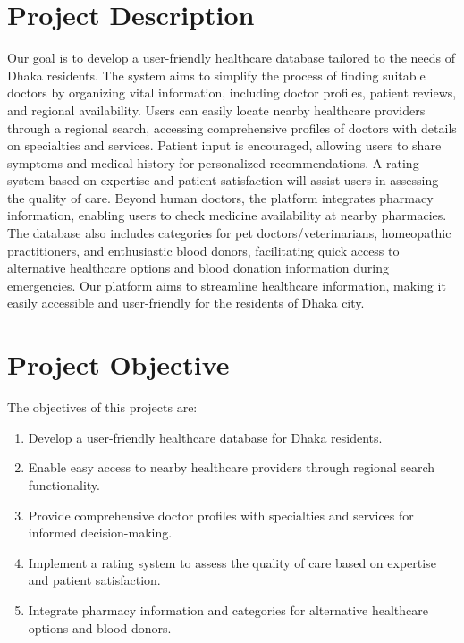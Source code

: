 \documentclass[11pt]{article}
\begin{document}
\section{Project Description}
Our goal is to develop a user-friendly healthcare database tailored to the needs of Dhaka residents. The system aims to simplify the process of finding suitable doctors by organizing vital information, including doctor profiles, patient reviews, and regional availability. Users can easily locate nearby healthcare providers through a regional search, accessing comprehensive profiles of doctors with details on specialties and services. Patient input is encouraged, allowing users to share symptoms and medical history for personalized recommendations. A rating system based on expertise and patient satisfaction will assist users in assessing the quality of care. Beyond human doctors, the platform integrates pharmacy information, enabling users to check medicine availability at nearby pharmacies. The database also includes categories for pet doctors/veterinarians, homeopathic practitioners, and enthusiastic blood donors, facilitating quick access to alternative healthcare options and blood donation information during emergencies. Our platform aims to streamline healthcare information, making it easily accessible and user-friendly for the residents of Dhaka city.

\section{Project Objective}
The objectives of this projects are:
\begin{enumerate}
    \item Develop a user-friendly healthcare database for Dhaka residents.
    \item Enable easy access to nearby healthcare providers through regional search functionality.
    \item Provide comprehensive doctor profiles with specialties and services for informed decision-making.
    \item Implement a rating system to assess the quality of care based on expertise and patient satisfaction.
    \item Integrate pharmacy information and categories for alternative healthcare options and blood donors.
\end{enumerate}
\end{document}
